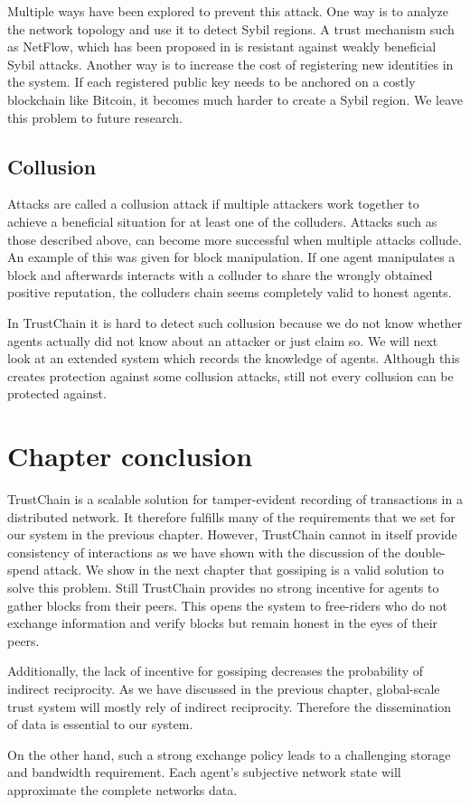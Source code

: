 Multiple ways have been explored to prevent this attack. One way is to analyze the network topology
and use it to detect Sybil regions. A trust mechanism such as NetFlow, which has been proposed in 
\cite{OTTE2017} is resistant against weakly beneficial Sybil attacks. Another way is to increase the cost of 
registering new identities in the system. If each registered public key needs to be anchored on a 
costly blockchain like Bitcoin, it becomes much harder to create a Sybil region. We leave this problem
to future research.

\subsection{Collusion}
\label{sec:collusion}
Attacks are called a collusion attack if multiple attackers work together to achieve a beneficial
situation for at least one of the colluders. Attacks such as those described above, 
can become more successful when multiple attacks collude. An example of this was given for block 
manipulation. If one agent manipulates a block and afterwards interacts with a colluder to share the
wrongly obtained positive reputation, the colluders chain seems completely valid to honest agents.

In TrustChain it is hard to detect such collusion because we do not know whether agents actually 
did not know about an attacker or just claim so. We will next look at an extended system which 
records the knowledge of agents. Although this creates protection against some collusion attacks, 
still not every collusion can be protected against.

\section{Chapter conclusion}
TrustChain is a scalable solution for tamper-evident recording of transactions in a distributed 
network. It therefore fulfills many of the requirements that we set for our system in the previous
chapter. However, TrustChain cannot in itself provide consistency of interactions as we have shown
with the discussion of the double-spend attack. We show in the next chapter that gossiping is a
valid solution to solve this problem. Still TrustChain provides no strong incentive for agents to 
gather blocks from their peers. This opens the system to free-riders who do not exchange information and verify 
blocks but remain honest in the eyes of their peers. 

Additionally, the lack of incentive for gossiping decreases the probability of indirect reciprocity.
As we have discussed in the previous chapter, global-scale trust system will mostly rely of indirect
reciprocity. Therefore the dissemination of data is essential to our system.

On the other hand, such a strong exchange policy leads to a challenging storage and bandwidth 
requirement. Each agent's subjective network state will approximate the complete networks data.